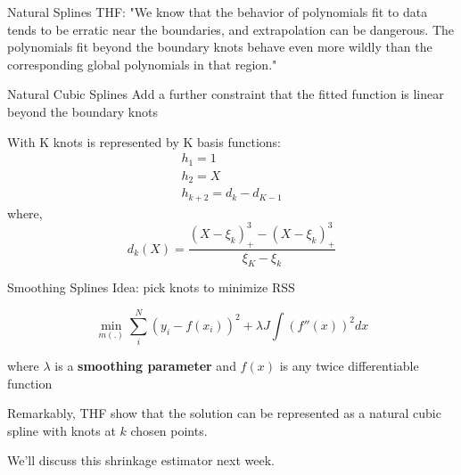 \begin{frame}{Natural Splines}
  THF: "We know that the behavior of polynomials fit to data tends to be erratic
  near the boundaries, and extrapolation can be dangerous. The polynomials fit beyond the boundary knots behave even more wildly than the corresponding global polynomials
  in that region." 

  \alert{Natural Cubic Splines} Add a further constraint that the fitted function is linear beyond the boundary knots

  With K knots is represented by K basis functions:
\vspace{-8pt}
  \begin{eqnarray*}
    h_1 = 1 \\
    h_2 = X \\
    h_{k+2} = d_k - d_{K-1}
  \end{eqnarray*} 
  where, $$d_k(X) = \frac{(X-\xi_k)_+^3 - (X-\xi_k)_+^3 }{\xi_K - \xi_k} $$
\end{frame}


\begin{frame}{Smoothing Splines}
Idea: pick knots to minimize RSS 

\[
\min_{m(.)} \sum_i^N (y_i-f(x_i))^2 +\lambda J \int (f''(x))^2 dx 
\]

where $\lambda$ is a \textbf{smoothing parameter} and $f(x)$ is any twice differentiable function

Remarkably, THF show that the solution can be represented as a natural cubic spline with knots at $k$ chosen points. 

We'll discuss this \alert{shrinkage} estimator next week.
\end{frame}

